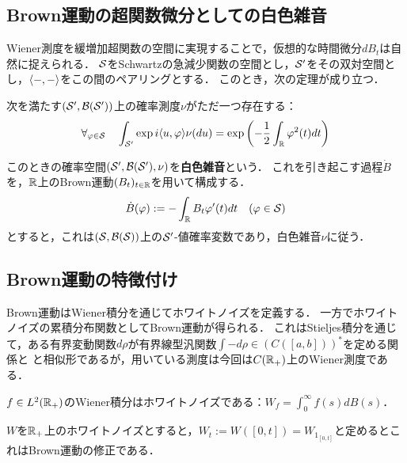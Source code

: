 \documentclass[uplatex,dvipdfmx]{jsreport}
\begin{document}
\subsection{Brown運動の超関数微分としての白色雑音}

\begin{discussion}
    Wiener測度を緩増加超関数の空間に実現することで，仮想的な時間微分$dB_t$は自然に捉えられる．
    $\S$をSchwartzの急減少関数の空間とし，$\S'$をその双対空間とし，$\brac{-,-}$をこの間のペアリングとする．
    このとき，次の定理が成り立つ．
    \begin{theorem}
        次を満たす$(\S',\B(\S'))$上の確率測度$\nu$がただ一つ存在する：
        \[\forall_{\varphi\in\S}\quad\int_{\S'}\exp{i\brac{u,\varphi}}\nu(du)=\exp\paren{-\frac{1}{2}\int_\R\varphi^2(t)dt}\]
    \end{theorem}
    このときの確率空間$(\S',\B(\S'),\nu)$を\textbf{白色雑音}という．
    これを引き起こす過程$\dot{B}$を，$\R$上のBrown運動$(B_t)_{t\in\R}$を用いて構成する．
    \[\dot{B}(\varphi):=-\int_\R B_t\varphi'(t)dt\quad(\varphi\in\S)\]
    とすると，これは$(\S,\B(\S))$上の$\S'$-値確率変数であり，白色雑音$\nu$に従う．
\end{discussion}

\subsection{Brown運動の特徴付け}

\begin{tcolorbox}[colframe=ForestGreen, colback=ForestGreen!10!white,breakable,colbacktitle=ForestGreen!40!white,coltitle=black,fonttitle=\bfseries\sffamily,
title=]
    Brown運動はWiener積分を通じてホワイトノイズを定義する．
    一方でホワイトノイズの累積分布関数としてBrown運動が得られる．
    これはStieljes積分を通じて，ある有界変動関数$d\rho$が有界線型汎関数$\int-d\rho\in (C([a,b]))^*$を定める関係と
    と相似形であるが，用いている測度は今回は$C(\R_+)$上のWiener測度である．
\end{tcolorbox}

\begin{proposition}
    $f\in L^2(\R_+)$のWiener積分はホワイトノイズである：$W_f=\int^\infty_0f(s)dB(s)$．
\end{proposition}

\begin{proposition}
    $W$を$\R_+$上のホワイトノイズとすると，$W_t:=W([0,t])=W_{1_{[0,t]}}$と定めるとこれはBrown運動の修正である．
\end{proposition}
\end{document}

